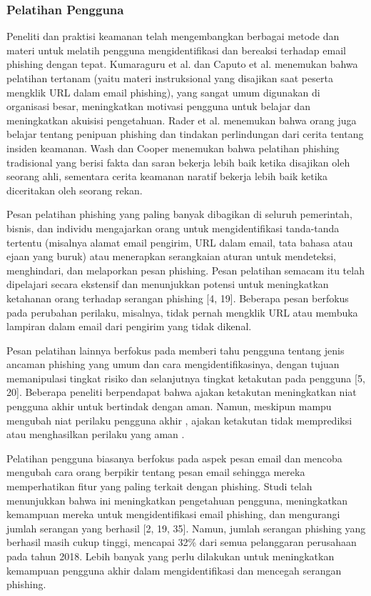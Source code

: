 \documentclass[lettersize,journal]{IEEEtran}
\begin{document}
\subsubsection{Pelatihan Pengguna}
Peneliti dan praktisi keamanan telah mengembangkan berbagai metode dan materi
untuk melatih pengguna mengidentifikasi dan bereaksi terhadap email phishing
dengan tepat. Kumaraguru et al. \cite{satusembilan} dan Caputo et al.
\cite{dua} menemukan bahwa pelatihan tertanam (yaitu materi instruksional yang
disajikan saat peserta mengklik URL dalam email phishing), yang sangat umum
digunakan di organisasi besar, meningkatkan motivasi pengguna untuk belajar dan
meningkatkan akuisisi pengetahuan. Rader et al. \cite{duatujuh} menemukan bahwa
orang juga belajar tentang penipuan phishing dan tindakan perlindungan dari
cerita tentang insiden keamanan. Wash dan Cooper \cite{tigalima} menemukan
bahwa pelatihan phishing tradisional yang berisi fakta dan saran bekerja lebih
baik ketika disajikan oleh seorang ahli, sementara cerita keamanan naratif
bekerja lebih baik ketika diceritakan oleh seorang rekan.

Pesan pelatihan phishing yang paling banyak dibagikan di seluruh pemerintah,
bisnis, dan individu mengajarkan orang untuk mengidentifikasi tanda-tanda
tertentu (misalnya alamat email pengirim, URL dalam email, tata bahasa atau
ejaan yang buruk) atau menerapkan serangkaian aturan untuk mendeteksi,
menghindari, dan melaporkan pesan phishing. Pesan pelatihan semacam itu telah
dipelajari secara ekstensif dan menunjukkan potensi untuk meningkatkan
ketahanan orang terhadap serangan phishing [4, 19]. Beberapa pesan berfokus
pada perubahan perilaku, misalnya, tidak pernah mengklik URL atau membuka
lampiran dalam email dari pengirim yang tidak dikenal.

Pesan pelatihan lainnya berfokus pada memberi tahu pengguna tentang jenis
ancaman phishing yang umum dan cara mengidentifikasinya, dengan tujuan
memanipulasi tingkat risiko dan selanjutnya tingkat ketakutan pada pengguna [5,
    20]. Beberapa peneliti berpendapat bahwa ajakan ketakutan meningkatkan niat
pengguna akhir untuk bertindak dengan aman. Namun, meskipun mampu mengubah niat
perilaku pengguna akhir \cite{lima}, ajakan ketakutan tidak memprediksi atau
menghasilkan perilaku yang aman \cite{enam}.

Pelatihan pengguna biasanya berfokus pada aspek pesan email dan mencoba
mengubah cara orang berpikir tentang pesan email sehingga mereka memperhatikan
fitur yang paling terkait dengan phishing. Studi telah menunjukkan bahwa ini
meningkatkan pengetahuan pengguna, meningkatkan kemampuan mereka untuk
mengidentifikasi email phishing, dan mengurangi jumlah serangan yang berhasil
  [2, 19, 35]. Namun, jumlah serangan phishing yang berhasil masih cukup tinggi,
mencapai 32\% dari semua pelanggaran perusahaan pada tahun 2018. Lebih banyak
yang perlu dilakukan untuk meningkatkan kemampuan pengguna akhir dalam
mengidentifikasi dan mencegah serangan phishing.
\end{document}
